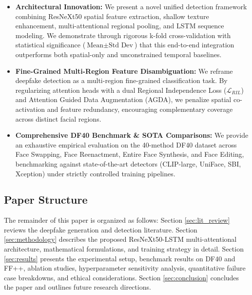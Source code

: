 \begin{itemize}
    \item \textbf{Architectural Innovation:} We present a novel unified detection framework combining ResNeXt50 spatial feature extraction, shallow texture enhancement, multi-attentional regional pooling, and LSTM sequence modeling. We demonstrate through rigorous k-fold cross-validation with statistical significance ($\text{Mean} \pm \text{Std Dev}$) that this end-to-end integration outperforms both spatial-only and unconstrained temporal baselines.
    \item \textbf{Fine-Grained Multi-Region Feature Disambiguation:} We reframe deepfake detection as a multi-region fine-grained classification task. By regularizing attention heads with a dual Regional Independence Loss ($\mathcal{L}_{RIL}$) and Attention Guided Data Augmentation (AGDA), we penalize spatial co-activation and feature redundancy, encouraging complementary coverage across distinct facial regions.
    \item \textbf{Comprehensive DF40 Benchmark \& SOTA Comparisons:} We provide an exhaustive empirical evaluation on the 40-method DF40 dataset across Face Swapping, Face Reenactment, Entire Face Synthesis, and Face Editing, benchmarking against state-of-the-art detectors (CLIP-large, UniFace, SBI, Xception) under strictly controlled training pipelines.
\end{itemize}

\subsection{Paper Structure}
The remainder of this paper is organized as follows: Section \ref{sec:lit_review} reviews the deepfake generation and detection literature. Section \ref{sec:methodology} describes the proposed ResNeXt50-LSTM multi-attentional architecture, mathematical formulations, and training strategy in detail. Section \ref{sec:results} presents the experimental setup, benchmark results on DF40 and FF++, ablation studies, hyperparameter sensitivity analysis, quantitative failure case breakdowns, and ethical considerations. Section \ref{sec:conclusion} concludes the paper and outlines future research directions.
